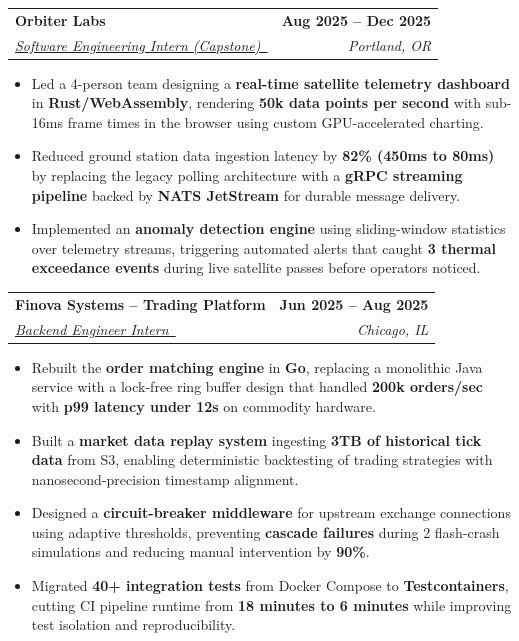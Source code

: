 \documentclass[a4paper,10pt]{article}
\makeatletter
\newcommand{\resumeItem}[1]{
  \item\small{\justifying #1 \vspace{-2pt}}
}
\newcommand{\resumeSubheading}[4]{
  \vspace{-2pt}\item
    \begin{tabular*}{1.0\textwidth}[t]{l@{\extracolsep{\fill}}r}
      \textbf{#1} & \textbf{\small #2} \\
      \textit{\small#3} & \textit{\small #4} \\
    \end{tabular*}\vspace{-6pt}
}
\newcommand{\resumeItemListStart}{\begin{itemize}}
\newcommand{\resumeItemListEnd}{\end{itemize}\vspace{-5pt}}
\makeatother
\begin{document}
    \resumeSubheading
   {Orbiter Labs}{Aug 2025 -- Dec 2025}
   {\href{https://morganchen.dev/view/orbiter/}{Software Engineering Intern (Capstone)~\scalebox{0.8}{\faLink}}}{Portland, OR}
   \resumeItemListStart
        \resumeItem{Led a 4-person team designing a \textbf{real-time satellite telemetry dashboard} in \textbf{Rust/WebAssembly}, rendering \textbf{50k data points per second} with sub-16ms frame times in the browser using custom GPU-accelerated charting.}
        \resumeItem{Reduced ground station data ingestion latency by \textbf{82\% (450ms to 80ms)} by replacing the legacy polling architecture with a \textbf{gRPC streaming pipeline} backed by \textbf{NATS JetStream} for durable message delivery.}
        \resumeItem{Implemented an \textbf{anomaly detection engine} using sliding-window statistics over telemetry streams, triggering automated alerts that caught \textbf{3 thermal exceedance events} during live satellite passes before operators noticed.}
   \resumeItemListEnd

    \resumeSubheading
   {Finova Systems -- Trading Platform}{Jun 2025 -- Aug 2025}
   {\href{https://morganchen.dev/view/finova/}{Backend Engineer Intern~\scalebox{0.8}{\faLink}}}{Chicago, IL}
   \resumeItemListStart
     \resumeItem{Rebuilt the \textbf{order matching engine} in \textbf{Go}, replacing a monolithic Java service with a lock-free ring buffer design that handled \textbf{200k orders/sec} with \textbf{p99 latency under 12\textmu s} on commodity hardware.}
     \resumeItem{Built a \textbf{market data replay system} ingesting \textbf{3TB of historical tick data} from S3, enabling deterministic backtesting of trading strategies with nanosecond-precision timestamp alignment.}
     \resumeItem{Designed a \textbf{circuit-breaker middleware} for upstream exchange connections using adaptive thresholds, preventing \textbf{cascade failures} during 2 flash-crash simulations and reducing manual intervention by \textbf{90\%}.}
     \resumeItem{Migrated \textbf{40+ integration tests} from Docker Compose to \textbf{Testcontainers}, cutting CI pipeline runtime from \textbf{18 minutes to 6 minutes} while improving test isolation and reproducibility.}
   \resumeItemListEnd
\end{document}

